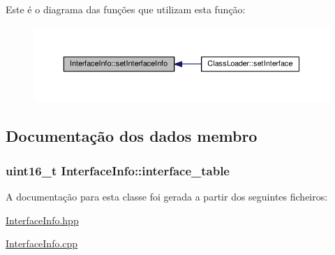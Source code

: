 Este é o diagrama das funções que utilizam esta função\+:
\nopagebreak
\begin{figure}[H]
\begin{center}
\leavevmode
\includegraphics[width=350pt]{class_interface_info_a9fa9166bbfee8837d611da9a88d1ba67_icgraph}
\end{center}
\end{figure}




\subsection{Documentação dos dados membro}
\subsubsection[{\texorpdfstring{interface\+\_\+table}{interface_table}}]{\setlength{\rightskip}{0pt plus 5cm}uint16\+\_\+t Interface\+Info\+::interface\+\_\+table}\hypertarget{class_interface_info_a5f6c0c20f598a2e8d000a9513776099c}{}\label{class_interface_info_a5f6c0c20f598a2e8d000a9513776099c}


A documentação para esta classe foi gerada a partir dos seguintes ficheiros\+:\begin{DoxyCompactItemize}
\item 
\hyperlink{_interface_info_8hpp}{Interface\+Info.\+hpp}\item 
\hyperlink{_interface_info_8cpp}{Interface\+Info.\+cpp}\end{DoxyCompactItemize}
